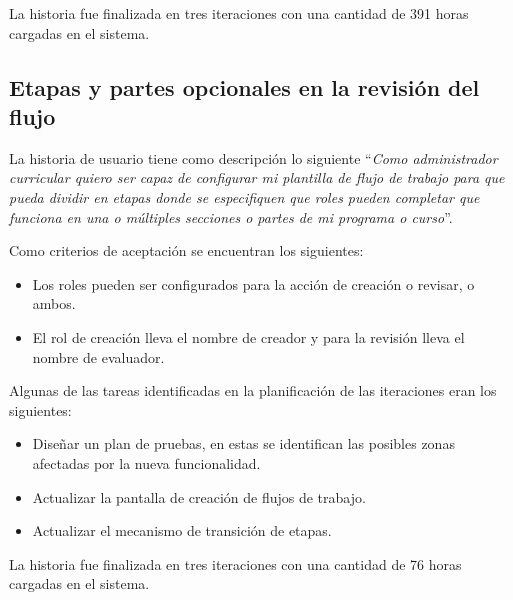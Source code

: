 La historia fue finalizada en tres iteraciones con una cantidad de 391 horas cargadas en el sistema.

\subsection{Etapas y partes opcionales en la revisión del flujo}
La historia de usuario tiene como descripción lo siguiente \enquote{\textit{Como administrador curricular quiero ser capaz de configurar mi plantilla de flujo de trabajo para que pueda dividir en etapas donde se especifiquen que roles pueden completar que funciona en una o múltiples secciones o partes de mi programa o curso}}.

Como criterios de aceptación se encuentran los siguientes:
\begin{itemize}
	\item Los roles pueden ser configurados para la acción de creación o revisar, o ambos.
	\item El rol de creación lleva el nombre de creador y para la revisión lleva el nombre de evaluador.
\end{itemize}

Algunas de las tareas identificadas en la planificación de las iteraciones eran los siguientes:
\begin{itemize}
	\item Diseñar un plan de pruebas, en estas se identifican las posibles zonas afectadas por la nueva funcionalidad.
	\item Actualizar la pantalla de creación de flujos de trabajo.
	\item Actualizar el mecanismo de transición de etapas.
\end{itemize}

La historia fue finalizada en tres iteraciones con una cantidad de 76 horas cargadas en el sistema.